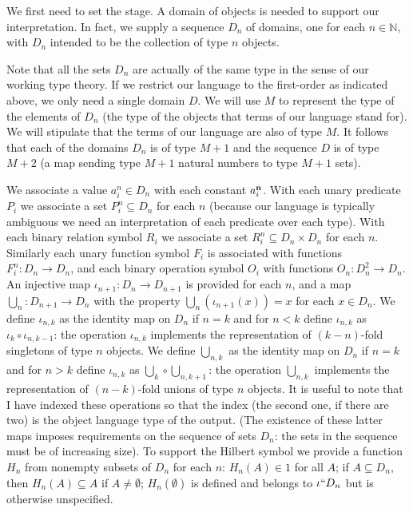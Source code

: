 \documentclass[12pt]{book}
\begin{document}
We first need to set the stage.  A domain of objects is needed to
support our interpretation.  In fact, we supply a sequence $D_n$ of
domains, one for each $n \in {\mathbb N}$, with $D_n$ intended to be
the collection of type $n$ objects. 

 Note that all the sets $D_n$ are
actually of the same type in the sense of our working type theory.  If
we restrict our language to the first-order as indicated above, we
only need a single domain $D$.   We will use $M$ to represent the type of the elements of $D_n$ (the type of the objects that terms of our language stand for).  We will stipulate that the terms of our language are also of type $M$.  It follows that each of the domains $D_n$ is of type $M+1$ and the sequence $D$ is of type $M+2$ (a map sending type $M+1$ natural numbers to type $M+1$ sets).

We associate a value $a^n_i \in D_n$ with each constant $a^{\bf n}_i$.
With each unary predicate $P_i$ we associate a set $P^n_i \subseteq
D_n$ for each $n$ (because our language is typically ambiguous we need
an interpretation of each predicate over each type).  With each binary
relation symbol $R_i$ we associate a set $R^n_i \subseteq D_n \times
D_n$ for each $n$.  Similarly each unary function symbol $F_i$ is
associated with functions $F^n_i : D_n \rightarrow D_n$, and each
binary operation symbol $O_i$ with functions $O_n:D_n^2 \rightarrow
D_n$.  An injective map $\iota_{n+1}:D_n \rightarrow D_{n+1}$ is
provided for each $n$, and a map $\bigcup_n:D_{n+1}\rightarrow D_n$
with the property $\bigcup_n(\iota_{n+1}(x)) = x$ for each $x \in D_n$.  We define $\iota_{n,k}$
as the identity map on $D_n$ if $n=k$ and for $n<k$ define $\iota_{n,k}$ as $\iota_{k} \circ \iota_{n,k-1}$:  the operation $\iota_{n,k}$ implements the representation of $(k-n)$-fold singletons of type $n$ objects.  We define $\bigcup_{n,k}$
as the identity map on $D_n$ if $n=k$ and for $n>k$ define $\iota_{n,k}$ as $\bigcup_{k} \circ \bigcup_{n,k+1}$:  the operation $\bigcup_{n,k}$ implements the representation of $(n-k)$-fold unions of type $n$ objects.  It is useful to note that I have indexed these operations so that the index (the second one, if there are two) is the object language type of the output.
(The existence of these latter maps imposes requirements on the
sequence of sets $D_n$: the sets in the sequence must be of increasing
size).  To support the Hilbert symbol we provide
a function $H_n$ from nonempty subsets of $D_n$ for
each $n$: $H_n(A) \in 1$ for all $A$; if $A \subseteq D_n$, then
$H_n(A) \subseteq A$ if $A \neq \emptyset$; $H_n(\emptyset)$ is
defined and belongs to $\iota``D_n$ but is otherwise unspecified.
\end{document}
